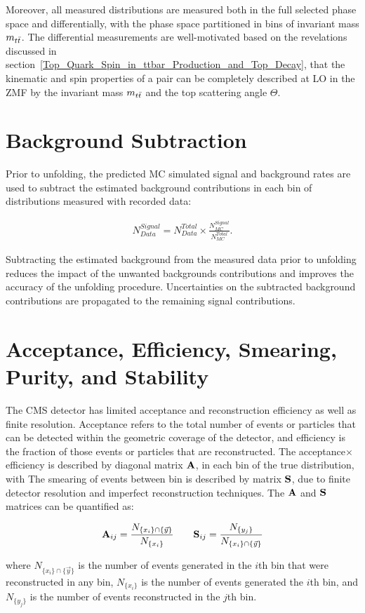 Moreover, all measured distributions are measured both in the full selected phase space and differentially, with the phase space partitioned in bins of \ttbar invariant mass $m_{t\bar{t}}$.
The differential measurements are well-motivated based on the revelations discussed in section~\ref{Top_Quark_Spin_in_ttbar_Production_and_Top_Decay}, that the kinematic and spin properties of a \ttbar pair can be completely described at LO in the \ttbar ZMF by the invariant mass $m_{t\bar{t}}$ and the top scattering angle $\Theta$.

\section{Background Subtraction}
\label{Background_Subtraction}
Prior to unfolding, the predicted MC simulated signal and background rates are used to subtract the estimated background contributions in each bin of distributions measured with recorded data:
\begin{linenomath*}
\begin{align}
N^{Signal}_{Data} = N^{Total}_{Data} \times \frac{N^{Signal}_{MC}}{N^{Total}_{MC}}.
\label{Data_Background_Subtraction}
\end{align}
\end{linenomath*}
Subtracting the estimated background from the measured data prior to unfolding reduces the impact of the unwanted backgrounds contributions and improves the accuracy of the unfolding procedure.
Uncertainties on the subtracted background contributions are propagated to the remaining signal contributions.

\section{Acceptance, Efficiency, Smearing, Purity, and Stability}
The CMS detector has limited acceptance and reconstruction efficiency as well as finite resolution.
Acceptance refers to the total number of events or particles that can be detected within the geometric coverage of the detector, and efficiency is the fraction of those events or particles that are reconstructed.
The acceptance$\times$efficiency is described by diagonal matrix $\mathbf{A}$, in each bin of the true distribution, with 
The smearing of events between bin is described by matrix $\mathbf{S}$, due to finite detector resolution and imperfect reconstruction techniques.
The $\mathbf{A}$ and $\mathbf{S}$ matrices can be quantified as:
\begin{linenomath*}
\begin{align}
\mathbf{A}_{ij} = \frac{N_{ \{ x_i \} \cap \{ \vec{y} \}}}{N_{ \{ x_i \} }} \quad \quad
\mathbf{S}_{ij} = \frac{N_{ \{ y_j \} }}{N_{ \{ x_i \} \cap \{ \vec{y} \}}}
\end{align}
\end{linenomath*}
where $N_{ \{ x_i \} \cap \{ \vec{y} \}}$ is the number of events generated in the $i$th bin that were reconstructed in any bin, $N_{ \{ x_i \} }$ is the number of events generated the $i$th bin, and $N_{ \{ y_j \} }$ is the number of events reconstructed in the $j$th bin.

